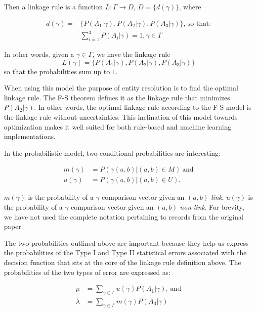 \documentclass[journal]{IEEEtran}
\begin{document}
    Then a linkage rule is a function $L:\varGamma \rightarrow D$,
    $D=\{d(\gamma)\}$, where
    
    \begin{align}
        d(\gamma) = &\{P(A_1|\gamma),P(A_2|\gamma),P(A_3|\gamma)\}\textrm{, so
        that:}\nonumber\\
        &\sum_{i=1}^{3}P(A_i|\gamma) = 1\nonumber, \gamma \in \varGamma\nonumber
    \end{align}

    In other words, given a $\gamma \in \varGamma$, we have the linkage rule
    \[
        L(\gamma) = \{P(A_1|\gamma), P(A_2|\gamma), P(A_3|\gamma)\}
    \]
    so that the probabilities sum up to $1$.

    When using this model the purpose of entity resolution is to find the
    optimal linkage rule.
    The F-S theorem defines it as the linkage rule that minimizes
    $P(A_2|\gamma)$.
    In other words, the optimal linkage rule according to the F-S model is the
    linkage rule without uncertainties.
    This inclination of this model towards optimization makes it well suited for
    both rule-based\cite{oyster2012} and machine learning\cite{deepm2020}
    implementations.
    
    In the probabilistic model, two conditional probabilities are interesting:

    \begin{align}
        m(\gamma)&=P(\gamma(a, b) | (a, b) \in M)~\textrm{and}\nonumber\\
        u(\gamma)&=P(\gamma(a, b) | (a, b) \in U)\textrm{.}\nonumber
    \end{align}

    \noindent
    $m(\gamma)$ is the probability of a $\gamma$ comparison vector given an
    $(a, b)$ \textit{link}.
    $u(\gamma)$ is the probability of a $\gamma$ comparison vector given an
    $(a, b)$ \textit{non-link}.
    For brevity, we have not used the complete notation pertaining to records
    from the original paper.

    The two probabilities outlined above are important because they help us
    express the probabilities of the Type I and Type II statistical errors
    associated with the decision function that sits at the core of the linkage
    rule definition above.
    The probabilities of the two types of error are expressed as:

    \begin{align}
        \mu&=\sum_{\gamma \in \varGamma}u(\gamma)P(A_1|\gamma)\textrm{,~and}\nonumber\\
        \lambda&=\sum_{\gamma \in \varGamma}m(\gamma)P(A_3|\gamma)\nonumber
    \end{align}
\end{document}
